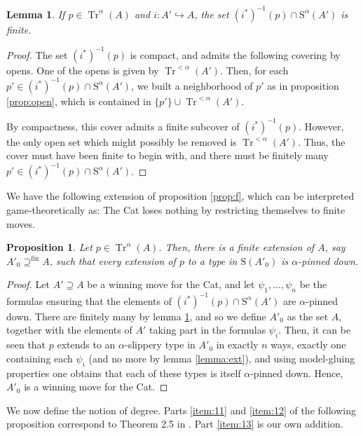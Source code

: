 \documentclass{article}
\newtheorem{prop}[theorem]{Proposition}
\newtheorem{lemma}[theorem]{Lemma}
\theoremstyle{nonumberplain}
\newtheorem{proof}{Proof}
\newcommand{\Stone}{\mathrm{S}}
\DeclareMathOperator{\Tr}{Tr}
\begin{document}
\begin{lemma}\label{lemma:deg}
If $p \in \Tr^\alpha(A)$ and $i \colon A' \hookrightarrow A$, the set $(i^*)^{-1}(p) \cap \Stone^\alpha(A')$ is finite.
\end{lemma}

\begin{proof}
The set $(i^*)^{-1}(p)$ is compact, and admits the following covering by opens. One of the opens is given by $\Tr^{<\alpha}(A')$. Then, for each $p' \in (i^*)^{-1}(p) \cap \Stone^\alpha(A')$, we built a neighborhood of $p'$ as in proposition \ref{prop:open}, which is contained in $\{p'\} \cup \Tr^{<\alpha}(A')$.

By compactness, this cover admits a finite subcover of $(i^*)^{-1}(p)$. However, the only open set which might possibly be removed is $\Tr^{<\alpha}(A')$. Thus, the cover must have been finite to begin with, and there must be finitely many $p' \in (i^*)^{-1}(p) \cap \Stone^\alpha(A')$.
\end{proof}

We have the following extension of proposition \ref{prop:f}, which can be interpreted game-theoretically as: The Cat loses nothing by restricting themselves to finite moves.

\begin{prop}
Let $p \in \Tr^\alpha(A)$. Then, there is a \emph{finite} extension of $A$, say $A'_0 \supseteq^{\text{fin}} A$, such that every extension of $p$ to a type in $\Stone(A'_0)$ is $\alpha$-pinned down.
\end{prop}

\begin{proof}
Let $A' \supseteq A$ be a winning move for the Cat, and let $\psi_1, \dots, \psi_n$ be the formulas ensuring that the elements of $(i^*)^{-1}(p) \cap \Stone^\alpha(A')$ are $\alpha$-pinned down. There are finitely many by lemma \ref{lemma:deg}, and so we define $A'_0$ as the set $A$, together with the elements of $A'$ taking part in the formulas $\psi_i$. Then, it can be seen that $p$ extends to an $\alpha$-slippery type in $A'_0$ in exactly $n$ ways, exactly one containing each $\psi_i$ (and no more by lemma \ref{lemma:ext}), and using model-gluing properties one obtains that each of these types is itself $\alpha$-pinned down. Hence, $A'_0$ is a winning move for the Cat.
\end{proof}

We now define the notion of degree. Parts \ref{item:11} and \ref{item:12} of the following proposition correspond to Theorem 2.5 in \cite{morley}. Part \ref{item:13} is our own addition.
\end{document}
